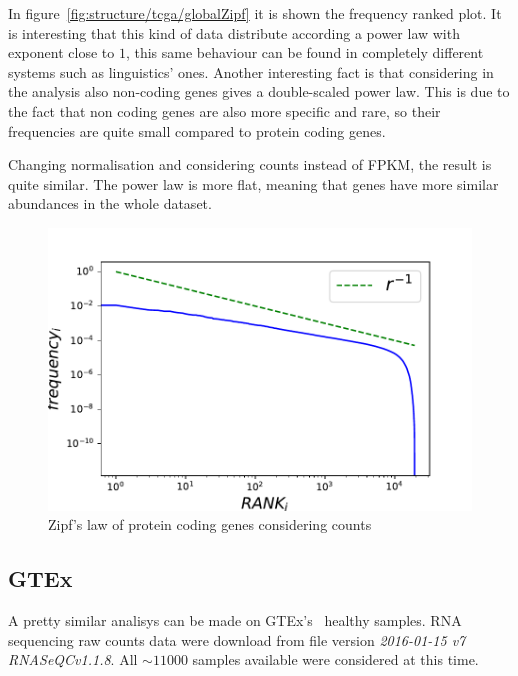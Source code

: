 In figure~\ref{fig:structure/tcga/globalZipf} it is shown the frequency ranked plot. It is interesting that this kind of data distribute according a power law with exponent close to $1$, this same behaviour can be found in completely different systems such as linguistics' ones. Another interesting fact is that considering in the analysis also non-coding genes gives a double-scaled power law. This is due to the fact that non coding genes are also more specific and rare, so their frequencies are quite small compared to protein coding genes.

Changing normalisation and considering counts instead of FPKM, the result is quite similar. The power law is more flat, meaning that genes have more similar abundances in the whole dataset. 
\begin{figure}
    \centering
    \includegraphics[width=0.8\linewidth]{pictures/structure/tcga/globalzipf_counts.pdf}
    \caption{Zipf's law of protein coding genes considering counts}
    \label{fig:structure/tcga/globalzipf_count}
\end{figure}

\subsection{GTEx}
A pretty similar analisys can be made on GTEx's~\cite{carithers2015novel} healthy samples. RNA sequencing raw counts data were download from file version \textit{2016-01-15 v7 RNASeQCv1.1.8}. All $\sim 11000$ samples available were considered at this time.

